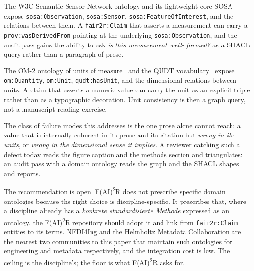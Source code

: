\begin{description}[leftmargin=1.2em,itemsep=2pt,topsep=4pt]
    \item[\textbf{Sensor data: SOSA / SSN.}] The W3C Semantic Sensor
        Network ontology and its lightweight core
        SOSA~\cite{janowicz2019sosa} expose
        \texttt{sosa:Observation}, \texttt{sosa:Sensor},
        \texttt{sosa:FeatureOfInterest}, and the relations between
        them. A \texttt{fair2r:Claim} that asserts a measurement can
        carry a \texttt{prov:wasDerivedFrom} pointing at the
        underlying \texttt{sosa:Observation}, and the audit pass
        gains the ability to ask \emph{is this measurement well-
        formed?} as a SHACL query rather than a paragraph of
        prose.
    \item[\textbf{Units of measure: OM-2 / QUDT.}] The OM-2 ontology
        of units of measure~\cite{rijgersberg2013om}
        and the QUDT vocabulary~\cite{qudt}
        expose \texttt{om:Quantity}, \texttt{om:Unit},
        \texttt{qudt:hasUnit}, and the dimensional relations between
        units. A claim that asserts a numeric value can carry the
        unit as an explicit triple rather than as a typographic
        decoration. Unit consistency is then a graph query, not a
        manuscript-reading exercise.
\end{description}

\noindent The class of failure modes this addresses is the one
prose alone cannot reach: a value that is internally coherent in
its prose and its citation but \emph{wrong in its units}, or
\emph{wrong in the dimensional sense it implies}. A reviewer
catching such a defect today reads the figure caption and the
methods section and triangulates; an audit pass with a domain
ontology reads the graph and the SHACL shapes and reports.

The recommendation is open. F(AI)\textsuperscript{2}R does not
prescribe specific domain ontologies because the right choice is
discipline-specific. It prescribes that, where a discipline already
has a \emph{konkrete standardisierte Methode} expressed as an
ontology, the F(AI)\textsuperscript{2}R repository should adopt it
and link from \texttt{fair2r:Claim} entities to its terms. NFDI4Ing
and the Helmholtz Metadata Collaboration are the nearest two
communities to this paper that maintain such ontologies for
engineering and metadata respectively, and the integration cost is
low. The ceiling is the discipline's; the floor is what
F(AI)\textsuperscript{2}R asks for.

